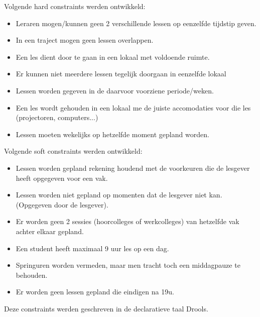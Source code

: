 \noindent Volgende hard constraints werden ontwikkeld:
\begin{itemize}
\item Leraren mogen/kunnen geen 2 verschillende lessen op eenzelfde tijdstip geven.
\item In een traject mogen geen lessen overlappen.
\item Een les dient door te gaan in een lokaal met voldoende ruimte.
\item Er kunnen niet meerdere lessen tegelijk doorgaan in eenzelfde lokaal
\item Lessen worden gegeven in de daarvoor voorziene periode/weken.
\item Een les wordt gehouden in een lokaal me de juiste accomodaties voor die les (projectoren, computers...)
\item Lessen moeten wekelijks op hetzelfde moment gepland worden.
\end{itemize}

\noindent Volgende soft constraints werden ontwikkeld:
\begin{itemize}
\item Lessen worden gepland rekening houdend met de voorkeuren die de lesgever heeft opgegeven voor een vak.
\item Lessen worden niet gepland op momenten dat de lesgever niet kan. (Opgegeven door de lesgever).
\item Er worden geen 2 sessies (hoorcolleges of werkcolleges) van hetzelfde vak achter elkaar gepland.
\item Een student heeft maximaal 9 uur les op een dag.
\item Springuren worden vermeden, maar men tracht toch een middagpauze te behouden.
\item Er worden geen lessen gepland die eindigen na 19u.
\end{itemize}

\noindent Deze constraints werden geschreven in de declaratieve taal Drools\cite{Drools}.